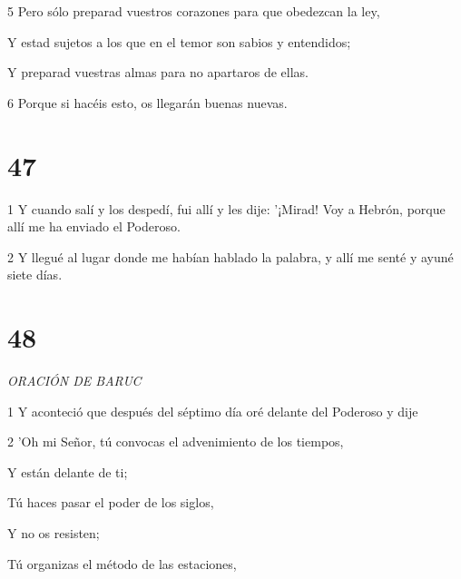 \par 5 Pero sólo preparad vuestros corazones para que obedezcan la ley,

\par Y estad sujetos a los que en el temor son sabios y entendidos;

\par Y preparad vuestras almas para no apartaros de ellas.

\par 6 Porque si hacéis esto, os llegarán buenas nuevas.

\par [De lo que ya os hablé antes; ni caeréis en el tormento del que os he testificado antes.'

\par 7 Pero en cuanto a la palabra de que me iban a llevar, no se la comuniqué ni a ellos ni a mi hijo.]

\chapter{47}

\par 1 Y cuando salí y los despedí, fui allí y les dije: '¡Mirad! Voy a Hebrón, porque allí me ha enviado el Poderoso.

\par 2 Y llegué al lugar donde me habían hablado la palabra, y allí me senté y ayuné siete días.

\chapter{48}

\par \textit{ORACIÓN DE BARUC}

\par 1 Y aconteció que después del séptimo día oré delante del Poderoso y dije

\par 2 'Oh mi Señor, tú convocas el advenimiento de los tiempos,

\par Y están delante de ti;

\par Tú haces pasar el poder de los siglos,

\par Y no os resisten;

\par Tú organizas el método de las estaciones,

